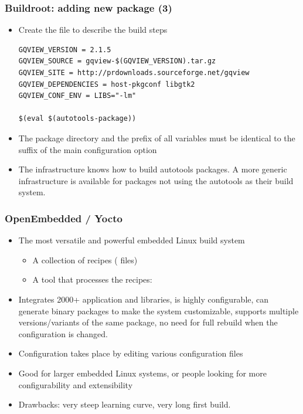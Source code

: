 \begin{frame}[fragile]
  \frametitle{Buildroot: adding new package (3)}
  \begin{itemize}
  \item Create the  file to describe the build steps
\scriptsize
\begin{block}{}
\begin{verbatim}
GQVIEW_VERSION = 2.1.5
GQVIEW_SOURCE = gqview-$(GQVIEW_VERSION).tar.gz
GQVIEW_SITE = http://prdownloads.sourceforge.net/gqview
GQVIEW_DEPENDENCIES = host-pkgconf libgtk2
GQVIEW_CONF_ENV = LIBS="-lm"

$(eval $(autotools-package))
\end{verbatim}
\end{block}
\normalsize
\item The package directory and the prefix of all variables must be
  identical to the suffix of the main configuration option
\item The  infrastructure knows how to build
  autotools packages. A more generic 
  infrastructure is available for packages not using the autotools
  as their build system.
\end{itemize}
\end{frame}

\begin{frame}
  \frametitle{OpenEmbedded / Yocto}
  \begin{itemize}
  \item The most versatile and powerful embedded Linux build system
    \begin{itemize}
    \item A collection of recipes ( files)
    \item A tool that processes the recipes: 
    \end{itemize}
  \item Integrates 2000+ application and libraries, is highly
    configurable, can generate binary packages to make the system
    customizable, supports multiple versions/variants of the same
    package, no need for full rebuild when the configuration is
    changed.
  \item Configuration takes place by editing various configuration
    files
  \item Good for larger embedded Linux systems, or people looking for
    more configurability and extensibility
  \item Drawbacks: very steep learning curve, very long first build.
  \end{itemize}
\end{frame}

